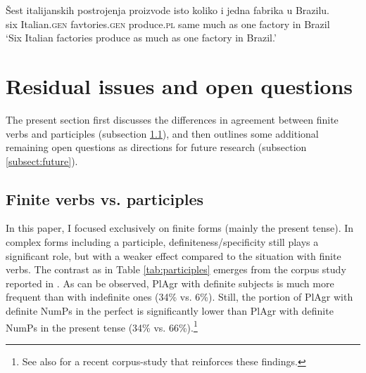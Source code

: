 \documentclass[output=paper,colorlinks,citecolor=brown
]{langscibook}
\begin{document}
\ea \label{ex-italian-plants}
\gll Šest italijanskih postrojenja proizvode isto koliko i jedna fabrika u Brazilu. \\
six Italian.\textsc{gen} favtories.\textsc{gen} produce.\textsc{pl} same much as one factory in Brazil \\
\glt `Six Italian factories produce as much as one factory in Brazil.'
\z





\section{Residual issues and open questions} \label{sect:residual-issues}

The present section first discusses the differences in agreement between finite verbs and participles (subsection \ref{subsect:finite-vs-participles}), and then outlines some additional remaining open questions as directions for future research (subsection \ref{subsect:future}).

\subsection{Finite verbs vs. participles} \label{subsect:finite-vs-participles}

In this paper, I focused exclusively on finite forms (mainly the present tense). In complex forms including a participle, definiteness/specificity still plays a significant role, but with a weaker effect compared to the situation with finite verbs. The contrast as in Table \ref{tab:participles} emerges from the corpus study reported in \citet{Milosavljevic2017}. As can be observed, PlAgr with definite subjects is much more frequent than with indefinite ones (34\% vs. 6\%). Still, the portion of PlAgr with definite NumPs in the perfect is significantly lower than PlAgr with definite NumPs in the present tense (34\% vs. 66\%).\footnote{See also \citet{milosavljevic-stojkovic-2025genderedness} for a recent corpus-study that reinforces these findings.} 
\end{document}
